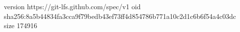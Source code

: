 version https://git-lfs.github.com/spec/v1
oid sha256:8a5b44834fa3cca9f79bedb43ef73ff4d854786b771a10c2d1c6b6f54a4c03dc
size 174916
